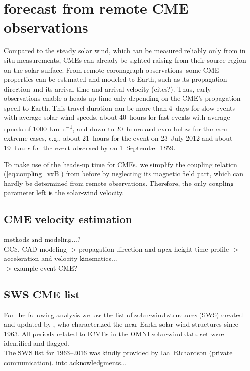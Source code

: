 \section{\Kp{} forecast from remote CME observations}
\label{sec:kp_forecast}
Compared to the steady solar wind, which can be measured reliably only from in situ measurements, CMEs can already be sighted raising from their source region on the solar surface. From remote coronagraph observations, some CME properties can be estimated and modeled to Earth, such as its propagation direction and its arrival time and arrival velocity (cites?). Thus, early observations enable a heads-up time only depending on the CME's propagation speed to Earth. This travel duration can be more than 4~days for slow events with average solar-wind speeds, about 40~hours for fast events with average speeds of \SI{1000}{\km\per\s}, and down to 20~hours and even below for the rare extreme cases, e.g., about 21~hours for the event on 23~July 2012 \citep{Russell2013,Temmer2015} and about 19~hours for the event observed by \citet{Carrington1859} on 1~September 1859.

To make use of the heads-up time for CMEs, we simplify the coupling relation (\ref{eq:coupling_vxB}) from before by neglecting its magnetic field part, which can hardly be determined from remote observations. Therefore, the only coupling parameter left is the solar-wind velocity.

\subsection{CME velocity estimation}
methods and modeling...?\\
GCS, CAD modeling -> propagation direction and apex height-time profile -> acceleration and velocity kinematics...\\
-> example event CME?\\

\subsection{SWS CME list}
For the following analysis we use the list of solar-wind structures (SWS) created and updated by \citet{Richardson2000,Richardson2012}, who characterized the near-Earth solar-wind structures since 1963. All periods related to ICMEs in the OMNI solar-wind data set were identified and flagged.\\

The SWS list for 1963--2016 was kindly provided by Ian~Richardson (private communication). into acknowledgments...\\


